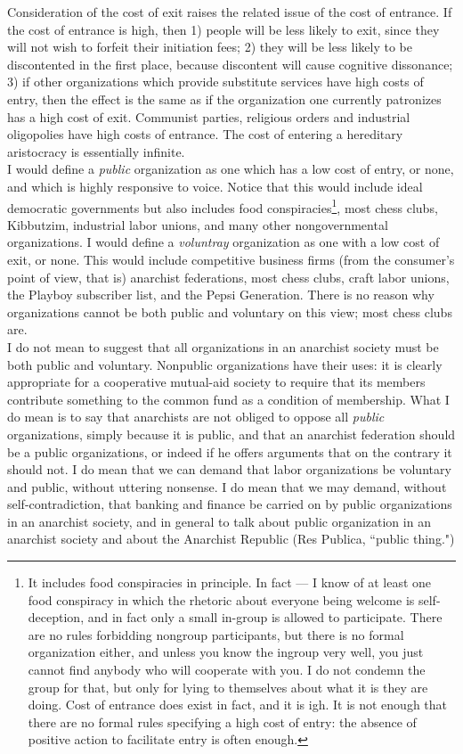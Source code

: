 Consideration of the cost of exit raises the related issue of the cost of entrance. If the cost of entrance is high, then 1) people will be less likely to exit, since they will not wish to forfeit their initiation fees; 2) they will be less likely to be discontented in the first place, because discontent will cause cognitive dissonance; 3) if other organizations which provide substitute services have high costs of entry, then the effect is the same as if the organization one currently patronizes has a high cost of exit. Communist parties, religious orders and industrial oligopolies have high costs of entrance. The cost of entering a hereditary aristocracy is essentially infinite.\\
I would define a \emph{public} organization as one which has a low cost of entry, or none, and which is highly responsive to voice. Notice that this would include ideal democratic governments but also includes food conspiracies\footnote{It includes food conspiracies in principle. In fact --- I know of at least one food conspiracy in which the rhetoric about everyone being welcome is self-deception, and in fact only a small in-group is allowed to participate. There are no rules forbidding nongroup participants, but there is no formal organization either, and unless you know the ingroup very well, you just cannot find anybody who will cooperate with you. I do not condemn the group for that, but only for lying to themselves about what it is they are doing. Cost of entrance does exist in fact, and it is igh. It is not enough that there are no formal rules specifying a high cost of entry: the absence of positive action to facilitate entry is often enough.}, most chess clubs, Kibbutzim, industrial labor unions, and many other nongovernmental organizations. I would define a \emph{voluntray} organization as one with a low cost of exit, or none. This would include competitive business firms (from the consumer's point of view, that is) anarchist federations, most chess clubs, craft labor unions, the Playboy subscriber list, and the Pepsi Generation. There is no reason why organizations cannot be both public and voluntary on this view; most chess clubs are.\\
I do not mean to suggest that all organizations in an anarchist society must be both public and voluntary. Nonpublic organizations have their uses: it is clearly appropriate for a cooperative mutual-aid society to require that its members contribute something to the common fund as a condition of membership. What I do mean is to say that anarchists are not obliged to oppose all \emph{public} organizations, simply because it is public, and that an anarchist federation should be a public organizations, or indeed if he offers arguments that on the contrary it should not. I do mean that we can demand that labor organizations be voluntary and public, without uttering nonsense. I do mean that we may demand, without self-contradiction, that banking and finance be carried on by public organizations in an anarchist society, and in general to talk about public organization in an anarchist society and about the Anarchist Republic (Res Publica, ``public thing.")\\

